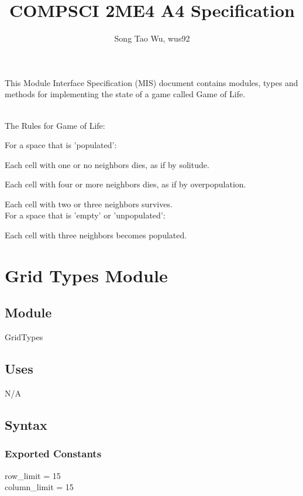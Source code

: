 \documentclass[12pt]{article}
\title{COMPSCI 2ME4 A4 Specification}
\author{Song Tao Wu, wus92}
\begin{document}
\maketitle
This Module Interface Specification (MIS) document contains modules, types and
methods for implementing the state of a game called Game of Life. \\ \\
\begin{Large}
The Rules for Game of Life: \\
\end{Large}
For a space that is 'populated':

Each cell with one or no neighbors dies, as if by solitude.

Each cell with four or more neighbors dies, as if by overpopulation.

Each cell with two or three neighbors survives. \\
For a space that is 'empty' or 'unpopulated': 

Each cell with three neighbors becomes populated.





\newpage

\section* {Grid Types Module}

\subsection*{Module}

GridTypes

\subsection* {Uses}

N/A

\subsection* {Syntax}

\subsubsection* {Exported Constants}

row\_limit = 15\\
column\_limit = 15
 
\end{document}

